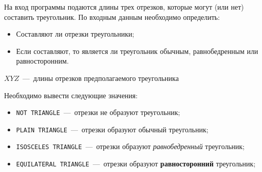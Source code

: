 На вход программы подаются длины трех отрезков, которые могут (или нет) составить треугольник.
По входным данным необходимо определить:

\begin{itemize}
	\item Составляют ли отрезки треугольники;
	\item Если составляют, то является ли треугольник обычным, равнобедренным или равносторонним.
\end{itemize}

\InputFile

$X Y Z$~---~длины отрезков предполагаемого треугольника

\OutputFile

Необходимо вывести следующие значения:

\begin{itemize}
	\item \texttt{NOT TRIANGLE}~---~отрезки не образуют треугольник;
	\item \texttt{PLAIN TRIANGLE}~---~отрезки образуют обычный треугольник;
	\item \texttt{ISOSCELES TRIANGLE}~---~отрезки образуют \emph{равнобедренный} треугольник;
	\item \texttt{EQUILATERAL TRIANGLE}~---~отрезки образуют \textbf{равносторонний} треугольник;
\end{itemize}

\SAMPLES
